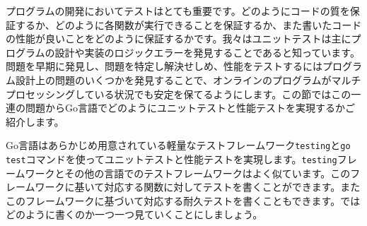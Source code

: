 プログラムの開発においてテストはとても重要です。どのようにコードの質を保証するか、どのように各関数が実行できることを保証するか、また書いたコードの性能が良いことをどのように保証するかです。我々はユニットテストは主にプログラムの設計や実装のロジックエラーを発見することであると知っています。問題を早期に発見し、問題を特定し解決せしめ、性能をテストするにはプログラム設計上の問題のいくつかを発見することで、オンラインのプログラムがマルチプロセッシングしている状況でも安定を保てるようにします。この節ではこの一連の問題からGo言語でどのようにユニットテストと性能テストを実現するかご紹介します。

Go言語はあらかじめ用意されている軽量なテストフレームワーク\texttt{testing}と\texttt{go test}コマンドを使ってユニットテストと性能テストを実現します。\texttt{testing}フレームワークとその他の言語でのテストフレームワークはよく似ています。このフレームワークに基いて対応する関数に対してテストを書くことができます。またこのフレームワークに基づいて対応する耐久テストを書くこともできます。ではどのように書くのか一つ一つ見ていくことにしましょう。
